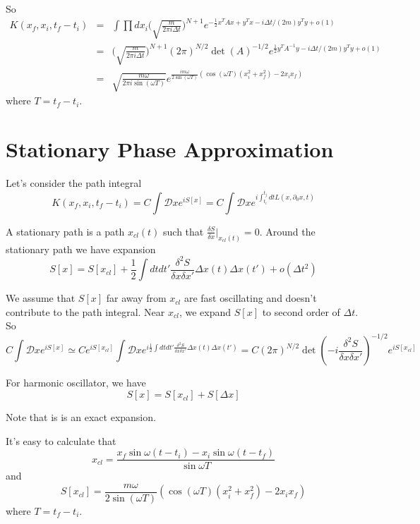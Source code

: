 \documentclass[12pt]{book}
\begin{document}
	So
	\begin{eqnarray}
		K(x_f,x_i,t_f-t_i)&=& \int\prod dx_i\bigg(\sqrt{\frac{m}{2\pi i\Delta t}}\bigg)^{N+1}e^{-\frac 12x^TAx+y^Tx-i\Delta t/(2m)y^Ty+o(1)}\\
		&=&\bigg(\sqrt{\frac{m}{2\pi i\Delta t}}\bigg)^{N+1}(2\pi)^{N/2}\det(A)^{-1/2}e^{\frac 12y^TA^{-1}y-i\Delta t/(2m)y^Ty+o(1)}\\
		&=&\sqrt{\frac{m\omega}{2\pi i\sin(\omega T)}}e^{\frac{im\omega}{2\sin(\omega T)}(\cos(\omega T)(x_i^2+x_f^2)-2x_ix_f)}
	\end{eqnarray}
	where $T=t_f-t_i$.
	
	\section{Stationary Phase Approximation}
	
	Let's consider the path integral 
	\begin{equation}
		K(x_f,x_i,t_f-t_i)=C\int \mathcal Dxe^{iS[x]}=C\int \mathcal Dxe^{i\int_{t_i}^{t_j}dtL(x,\partial_0 x,t)}
	\end{equation}
	
	A stationary path is a path $x_{cl}(t)$ such that $\frac{\delta S}{\delta x}\big|_{x_{cl}(t)}=0$. Around the stationary path we have expansion
	\begin{equation}
		S[x]=S[x_{cl}]+\frac 12\int dtdt' \frac{\delta^2 S}{\delta x\delta x'}\Delta x(t)\Delta x(t')+o(\Delta t^2)
	\end{equation}
	
	We assume that $S[x]$ far away from $x_{cl}$ are fast oscillating and doesn't contribute to the path integral. Near $x_{cl}$, we expand $S[x]$ to second order of $\Delta t$. So
	\begin{equation}
		C\int \mathcal Dxe^{iS[x]}\simeq Ce^{iS[x_{cl}]}\int \mathcal Dxe^{i\frac 12\int dtdt' \frac{\delta^2 S}{\delta x\delta x'}\Delta x(t)\Delta x(t')}=C(2\pi)^{N/2}\det(-i\frac{\delta^2 S}{\delta x\delta x'})^{-1/2}e^{iS[x_{cl}]}
	\end{equation}
	
	For harmonic oscillator, we have
	\begin{equation}
		S[x]=S[x_{cl}]+S[\Delta x]
	\end{equation}
	
	Note that is is an exact expansion.
	
	It's easy to calculate that 
	\begin{equation}
		x_{cl}=\frac{x_f\sin\omega(t-t_i)-x_i\sin\omega(t-t_f)}{\sin\omega T}
	\end{equation}
	and 
	\begin{equation}
		S[x_{cl}]=\frac{m\omega}{2\sin(\omega T)}(\cos(\omega T)(x_i^2+x_f^2)-2x_ix_f)
	\end{equation}
	where $T=t_f-t_i$.
	
\end{document}
